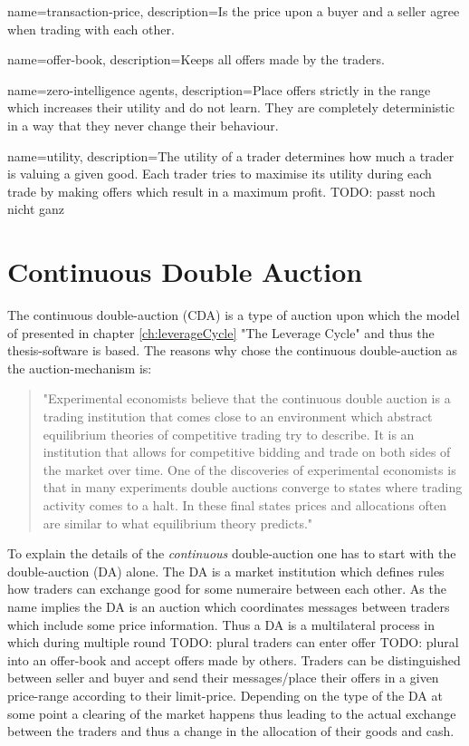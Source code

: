 \documentclass[../Bachelorarbeit.tex]{subfiles}
\begin{document}
 {
	name=transaction-price,
	description={Is the price upon a buyer and a seller agree when trading with each other.}
}

 {
	name=offer-book,
	description={Keeps all offers made by the traders.}
}

 {
	name=zero-intelligence agents,
	description={Place offers strictly in the range which increases their utility and do not learn. They are completely deterministic in a way that they never change their behaviour.}
}

 {
	name=utility,
	description={The utility of a trader determines how much a trader is valuing a given good. Each trader tries to maximise its utility during each trade by making offers which result in a maximum profit. TODO: passt noch nicht ganz}
}

\section{Continuous Double Auction}	
The continuous double-auction (CDA) is a type of auction upon which the model of \cite{Breuer2015} presented in chapter \ref{ch:leverageCycle} "The Leverage Cycle" and thus the thesis-software is based. The reasons why \cite{Breuer2015} chose the continuous double-auction as the auction-mechanism is:

\begin{quote}
"Experimental economists believe that the continuous double auction is a trading institution that comes close to an environment which abstract equilibrium theories of competitive trading try to describe. It is an institution that allows for competitive bidding and trade on both sides of the market over time. One of the discoveries of experimental economists is that in many experiments double auctions converge to states where trading activity comes to a halt. In these final states prices and allocations often are similar to what equilibrium theory predicts."
\end{quote}

\medskip

To explain the details of the \textit{continuous} double-auction one has to start with the double-auction (DA) alone. The DA is a \gls{market institution} which defines rules how traders can exchange \gls{good} for some \gls{numeraire} between each other. As the name implies the DA is an \gls{auction} which coordinates messages between traders which include some price information. Thus a DA is a multilateral process in which during multiple \gls{round} TODO: plural traders can enter \gls{offer} TODO: plural into an \gls{offer-book} and accept offers made by others. Traders can be distinguished between \gls{seller} and \gls{buyer} and send their messages/place their offers in a given price-range according to their \gls{limit-price}. Depending on the type of the DA at some point a \gls{clearing} of the market happens thus leading to the actual exchange between the traders and thus a change in the allocation of their goods and cash. 
\end{document}
